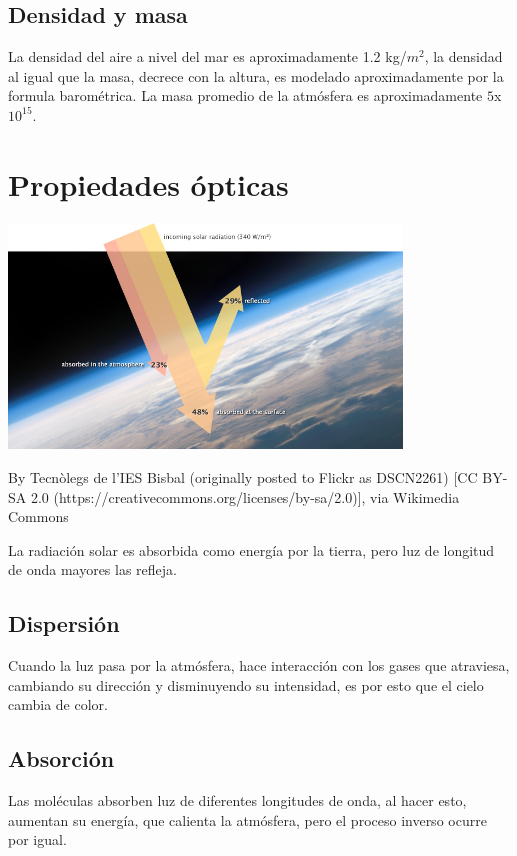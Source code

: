 \documentclass[11pt]{article}
\begin{document}
    \subsection{Densidad y masa}
    La densidad del aire a nivel del mar es aproximadamente 1.2 kg/$m^2$, la densidad al igual que la masa, decrece con la altura, es modelado aproximadamente por la formula barométrica. La masa promedio de la atmósfera es aproximadamente $5$x$10^15$.


\section{Propiedades ópticas}

\begin{center}
\includegraphics[height=6cm]{NASA.jpg}

By Tecnòlegs de l'IES Bisbal (originally posted to Flickr as DSCN2261) [CC BY-SA 2.0 (https://creativecommons.org/licenses/by-sa/2.0)], via Wikimedia Commons
\end{center}

    La radiación solar es absorbida como energía por la tierra, pero luz de longitud de onda mayores las refleja.
    
	\subsection{Dispersión}
	Cuando la luz pasa por la atmósfera, hace interacción con los gases que atraviesa, cambiando su dirección y disminuyendo su intensidad, es por esto que el cielo cambia de color.
    
    \subsection{Absorción}
    Las moléculas absorben luz de diferentes longitudes de onda, al hacer esto, aumentan su energía, que calienta la atmósfera, pero el proceso inverso ocurre por igual.
    
\end{document}
